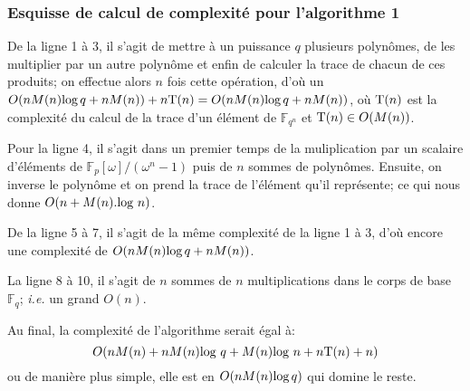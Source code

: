 \documentclass[a4paper]{article} %
\numberwithin{equation}{section}
\newcommand\GF[1]{\mathbb{F}_{#1}}
\begin{document}
\subsubsection*{Esquisse de calcul de complexité pour l'algorithme 1}
De la ligne 1 à 3, il s'agit de mettre à un puissance $q$ plusieurs polynômes, de les multiplier par un autre polynôme et enfin de calculer la trace de chacun de ces produits; on effectue alors $n$ fois cette opération, d'où un $O(nM(n)\textup{log}\,q + nM(n)) + n\textup{T}(n) = O(nM(n)\textup{log}\,q + nM(n))$, où $\textup{T}(n)$ est la complexité du calcul de la trace d'un élément de $\GF{q^n}$ et $\textup{T}(n) \in O(M(n))$.\par
Pour la ligne 4, il s'agit dans un premier temps de la muliplication par un scalaire d'éléments de $\mathbb{F}_p[\omega]/(\omega^n - 1)$ puis de $n$ sommes de polynômes. Ensuite, on inverse le polynôme et on prend la trace de l'élément qu'il représente; ce qui nous donne $O(n + M(n).\textup{log }n)$.\par 
De la ligne 5 à 7, il s'agit de la même complexité de la ligne 1 à 3, d'où encore une complexité de $O(nM(n)\textup{log}\,q + nM(n))$.\par
La ligne 8 à 10, il s'agit de $n$ sommes de $n$ multiplications dans le corps de base $\GF{q}$; \textit{i.e.} un grand $O(n)$.\par
Au final, la complexité de l'algorithme serait égal à:
 \[O(nM(n) + nM(n)\textup{log }q +  M(n)\textup{log }n + n\textup{T}(n) + n)\] 
ou de manière plus simple, elle est en $O(nM(n)\textup{log}\,q)$ qui domine le reste.
\end{document}
